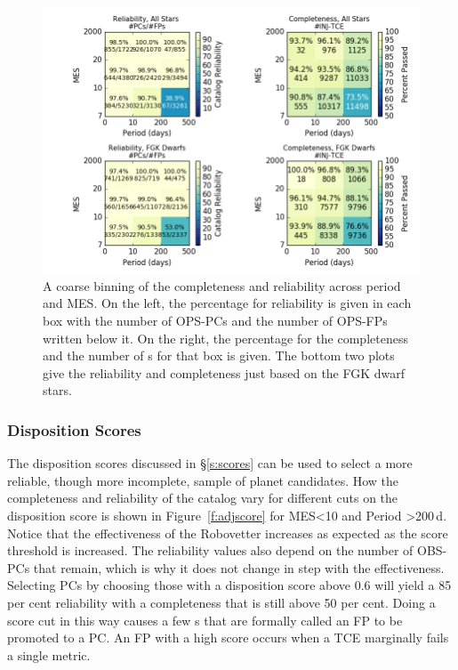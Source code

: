 \begin{figure}[h!]
\begin{center}
\includegraphics[width=0.95\linewidth]{fig-completeReliabilityCard.png}
\caption{\label{f:score} A coarse binning of the completeness and reliability across period and MES. On the left, the percentage for reliability is given in each box with the number of OPS-PCs and the number of OPS-FPs written below it.  On the right, the percentage for the completeness and the number of \injtce s for that box is given. The bottom two plots give the reliability and completeness just based on the FGK dwarf stars. }
\end{center}
\end{figure}


\subsubsection{Disposition Scores}
\label{s:crscores}
The disposition scores discussed in \S\ref{s:scores} can be used to select a more reliable, though more incomplete, sample of planet candidates.  How the completeness and reliability of the catalog vary for different cuts on the disposition score is shown in Figure~\ref{f:adjscore} for MES<10 and Period >200\,d. Notice that the effectiveness of the Robovetter increases as expected as the score threshold is increased.  The reliability values also depend on the number of OBS-PCs that remain, which is why it does not change in step with the effectiveness.  Selecting PCs by choosing those with a disposition score above 0.6 will yield a 85 per cent reliability with a completeness that is still above 50 per cent. Doing a score cut in this way causes a few \opstce s that are formally called an FP to be promoted to a PC. An FP with a high score occurs when a TCE marginally fails a single metric.

